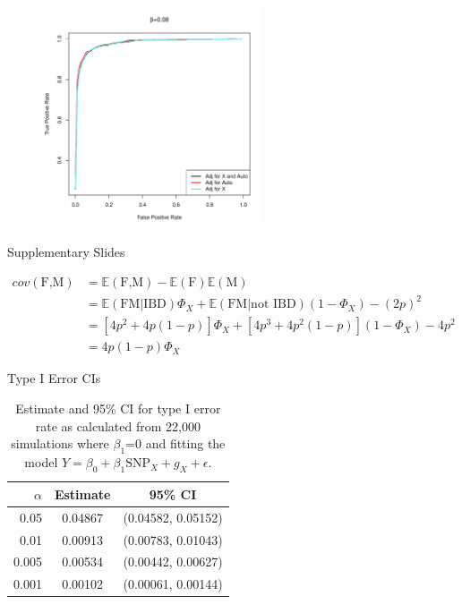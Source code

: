 \documentclass{beamer}
\begin{document}
\begin{frame}
\begin{figure}
\includegraphics[height=6.5cm]{../power_3models_beta08.pdf}
\end{figure}
\end{frame}

\begin{frame}
\Large
\centering
Supplementary Slides
\end{frame}

\begin{frame}
\begin{align*}
cov(\mbox{F,M})&=\mathbb{E}(\mbox{F,M})-\mathbb{E}(\mbox{F})\mathbb{E}(\mbox{M})\\
&=\mathbb{E}(\mbox{FM}|\mbox{IBD})\Phi_X +\mathbb{E}(\mbox{FM}|\mbox{not IBD})(1-\Phi_X) -(2p)^2 \\
&=[4p^2 + 4p(1-p)]\Phi_X + [4p^3 + 4p^2(1-p)](1-\Phi_X) -4p^2 \\
&= 4p(1-p)\Phi_X
\end{align*}
\end{frame}


\begin{frame}{Type I Error CIs}
\begin{table}[ht]
\centering
\begin{tabular}{r|cc}
  \hline
  $\alpha$ & Estimate & 95\% CI \\ 
  \hline
 0.05 & 0.04867 & (0.04582, 0.05152) \\ 
 0.01 & 0.00913 & (0.00783, 0.01043) \\ 
 0.005 & 0.00534 & (0.00442, 0.00627) \\ 
 0.001 & 0.00102 & (0.00061, 0.00144) \\ 
   \hline
\end{tabular}
\caption{Estimate and 95\% CI for type I error rate as calculated from 22,000 simulations where $\beta_1$=0 and fitting the model $Y = \beta_0 + \beta_1 \mbox{SNP}_X + g_X + \epsilon$.}
\end{table}
\end{frame}
\end{document}
